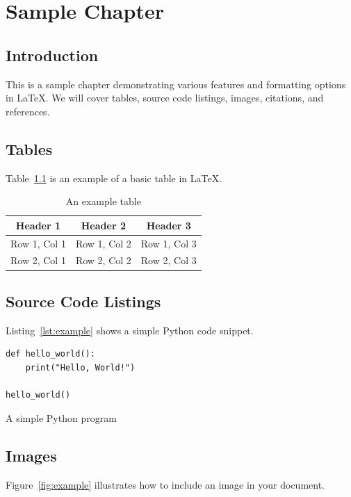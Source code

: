 \chapter{Sample Chapter}
\label{chap:sample}

\section{Introduction}
This is a sample chapter demonstrating various features and formatting options in \LaTeX. We will cover tables, source code listings, images, citations, and references.

\section{Tables}
Table~\ref{tab:example} is an example of a basic table in \LaTeX.

\begin{table}[h]
    \centering
    \begin{tabular}{|c|c|c|}
        \hline
        Header 1     & Header 2     & Header 3     \\
        \hline
        Row 1, Col 1 & Row 1, Col 2 & Row 1, Col 3 \\
        Row 2, Col 1 & Row 2, Col 2 & Row 2, Col 3 \\
        \hline
    \end{tabular}
    \caption{An example table}
    \label{tab:example}
\end{table}

\section{Source Code Listings}
Listing~\ref{lst:example} shows a simple Python code snippet.

\begin{listing}[H]
    \begin{verbatim}
def hello_world():
    print("Hello, World!")

hello_world()
    \end{verbatim}
    \caption{A simple Python program}
    \label{lst:example}
\end{listing}

\section{Images}
Figure~\ref{fig:example} illustrates how to include an image in your document.

